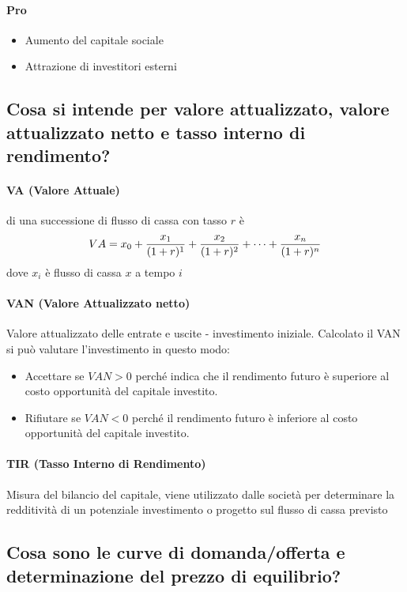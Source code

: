 \documentclass[12pt]{article}
\begin{document}
\paragraph{Pro}
\begin{itemize}
    \item Aumento del capitale sociale
    \item Attrazione di investitori esterni
\end{itemize}
\subsection{Cosa si intende per valore attualizzato, valore attualizzato netto e tasso interno di rendimento?}
\paragraph{VA (Valore Attuale)} di una successione di flusso di cassa con tasso $r$ è $$VA = {x_0+{x_1\over(1+r)^1}+{x_2\over(1+r)^2}+\dots+{x_n\over(1+r)^n}}$$
dove $x_i$ è flusso di cassa $x$ a tempo $i$
\paragraph{VAN (Valore Attualizzato netto)}  Valore attualizzato delle entrate e uscite - investimento iniziale. Calcolato il VAN si può valutare l’investimento in questo modo:
\begin{itemize}
    \item Accettare se $VAN > 0$ perché indica che il rendimento futuro è superiore al costo opportunità del capitale investito.
    \item Rifiutare se $VAN<0$ perché il rendimento futuro è inferiore al costo opportunità del capitale investito.
\end{itemize}
\paragraph{TIR (Tasso Interno di Rendimento)} Misura del bilancio del capitale, viene utilizzato dalle società per determinare la redditività di un potenziale investimento o progetto sul flusso di cassa previsto
\newpage
\subsection{Cosa sono le curve di domanda/offerta e determinazione del prezzo di equilibrio?}
\end{document}
